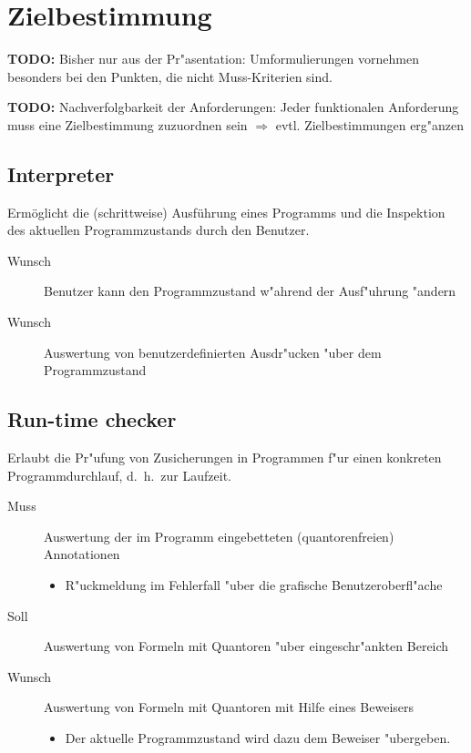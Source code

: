 \section{Zielbestimmung}%

\textbf{TODO:} Bisher nur aus der Pr"asentation: Umformulierungen vornehmen besonders bei den Punkten, die nicht Muss-Kriterien sind.%

\textbf{TODO:} Nachverfolgbarkeit der Anforderungen: Jeder funktionalen Anforderung muss eine Zielbestimmung zuzuordnen sein $\Rightarrow$ evtl. Zielbestimmungen erg"anzen%

\subsection{\see Interpreter}%

Ermöglicht die (schrittweise) Ausführung eines \see Programms und die Inspektion des aktuellen \see Programmzustands durch den Benutzer.%

\begin{description}%
    \item[Wunsch] Benutzer kann den Programmzustand w"ahrend der Ausf"uhrung "andern%
    \item[Wunsch] Auswertung von benutzerdefinierten \see Ausdr"ucken "uber dem Programmzustand%
\end{description}%

\subsection{\see Run-time checker}%

Erlaubt die Pr"ufung von \see Zusicherungen in Programmen f"ur einen konkreten Programmdurchlauf, d.~h.\ zur Laufzeit.%

\begin{description}%
    \item [Muss] Auswertung der im Programm eingebetteten (quantorenfreien) \see Annotationen%
        \begin{itemize}%
            \item R"uckmeldung im Fehlerfall "uber die grafische Benutzeroberfl"ache%
        \end{itemize}%
    \item [Soll] Auswertung von Formeln mit \see Quantoren "uber eingeschr"ankten Bereich%
    \item [Wunsch] Auswertung von Formeln mit Quantoren mit Hilfe eines \see Beweisers%
        \begin{itemize}%
            \item Der aktuelle Programmzustand wird dazu dem Beweiser "ubergeben.%
        \end{itemize}%
\end{description}%

